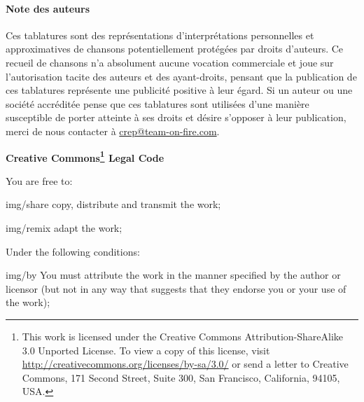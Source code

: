 {  \paragraph{Note des auteurs}
  Ces tablatures sont des représentations d'interprétations personnelles
  et approximatives de chansons potentiellement protégées par droits
  d'auteurs. Ce recueil de chansons n'a absolument aucune vocation
  commerciale et joue sur l'autorisation tacite des auteurs et des
  ayant-droits, pensant que la publication de ces tablatures représente
  une publicité positive à leur égard. Si un auteur ou une société
  accréditée pense que ces tablatures sont utilisées d'une manière
  susceptible de porter atteinte à ses droits et désire s'opposer à leur
  publication, merci de nous contacter à \url{crep@team-on-fire.com}.
}{
  \begin{center}
    \textbf{\LARGE{Creative Commons\footnote{ This work is licensed
          under the Creative Commons Attribution-ShareAlike 3.0 Unported
          License. To view a copy of this license, visit
          \url{http://creativecommons.org/licenses/by-sa/3.0/} or send a
          letter to Creative Commons, 171 Second Street, Suite 300, San
          Francisco, California, 94105, USA.} Legal Code} }
  \end{center}
  \vspace{1cm}

  \begin{lblock}{You are free to:}

    \begin{pictonote}{img/share}
       copy, distribute and transmit the work;
    \end{pictonote}

    \begin{pictonote}{img/remix}
       adapt the work;
    \end{pictonote}

  \end{lblock}
  \begin{lblock}{Under the following conditions:}

    \begin{pictonote}{img/by}
       You must attribute the work in the manner
      specified by the author or licensor (but not in any way that
      suggests that they endorse you or your use of the work);
    \end{pictonote}


\end{lblock}}
